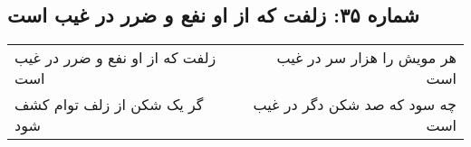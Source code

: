 \begin{center}
\section*{شماره ۳۵: زلفت که از او نفع و ضرر در غیب است}
\label{sec:035}
\begin{longtable}{l p{0.5cm} r}
زلفت که از او نفع و ضرر در غیب است
&&
هر مویش را هزار سر در غیب است
\\
گر یک شکن از زلف توام کشف شود
&&
چه سود که صد شکن دگر در غیب است
\\
\end{longtable}
\end{center}
